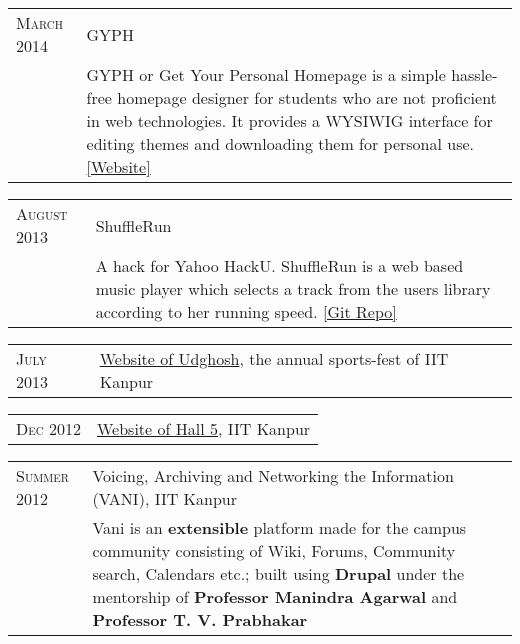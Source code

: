 \documentclass[a4paper,10pt]{article} %
\begin{document}
\begin{tabular}{>{\raggedleft}p{2.2cm}|p{15cm}}
    \textsc{March 2014} & GYPH\\
                        & \footnotesize{GYPH or Get Your Personal Homepage
                           is a simple hassle-free homepage designer for students who are not
                           proficient in web technologies. It provides a WYSIWIG
                           interface for editing themes and downloading them for personal use.
                           \href{http://gyph2.herokuapp.com/} {[Website]} } \\
\end{tabular}

\begin{tabular}{>{\raggedleft}p{2.2cm}|p{15cm}}
    \textsc{August 2013} & ShuffleRun\\
                         & \footnotesize{A hack for Yahoo HackU. ShuffleRun is a
                            web based music player which selects a track from the users library according to her running speed.
                            \href{https://github.com/srijanshetty/ShuffleRun} {[Git Repo]}}\\
\end{tabular}

\begin{tabular}{>{\raggedleft}p{2.2cm}|p{15cm}}
    \textsc{July 2013} & \href{www.udghosh.org}{Website of Udghosh}, the annual sports-fest of IIT Kanpur\\
\end{tabular}

\begin{tabular}{>{\raggedleft}p{2.2cm}|p{15cm}}
    \textsc{Dec 2012} & \href{http://www.iitk.ac.in/hall5}{Website of Hall 5}, IIT Kanpur \\
\end{tabular}

\begin{tabular}{>{\raggedleft}p{2.2cm}|p{15cm}}
    \textsc{Summer 2012} & Voicing, Archiving and Networking the Information \textsc{(VANI)}, IIT Kanpur\\
                           & \footnotesize{Vani is an \textbf{extensible} platform
                              made for the campus community consisting of Wiki, Forums,
                              Community search, Calendars etc.; built using \textbf{Drupal}
                              under the mentorship of \textbf{Professor Manindra Agarwal} and
                              \textbf{Professor T. V. Prabhakar} } \\
\end{tabular}
\end{document}
